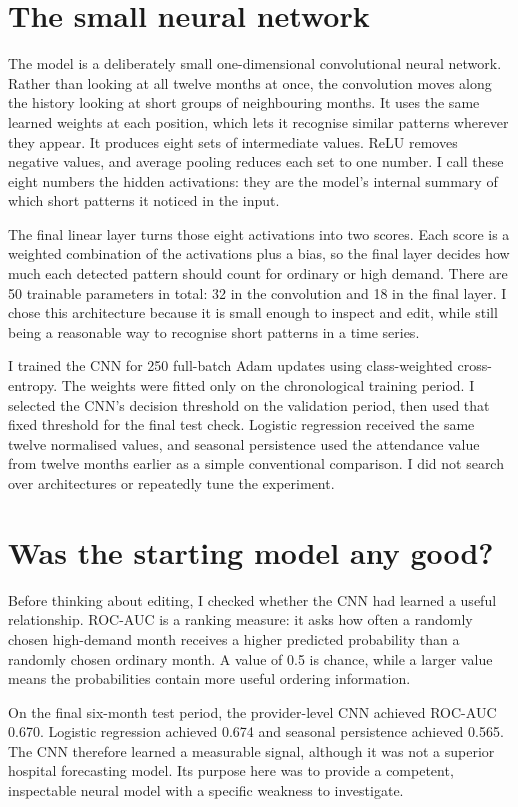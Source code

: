 \documentclass[11pt,a4paper]{article}
\begin{document}
\section*{The small neural network}
The model is a deliberately small one-dimensional convolutional neural network. Rather than looking at all twelve months at once, the convolution moves along the history looking at short groups of neighbouring months. It uses the same learned weights at each position, which lets it recognise similar patterns wherever they appear. It produces eight sets of intermediate values. ReLU removes negative values, and average pooling reduces each set to one number. I call these eight numbers the hidden activations: they are the model's internal summary of which short patterns it noticed in the input.

The final linear layer turns those eight activations into two scores. Each score is a weighted combination of the activations plus a bias, so the final layer decides how much each detected pattern should count for ordinary or high demand. There are 50 trainable parameters in total: 32 in the convolution and 18 in the final layer. I chose this architecture because it is small enough to inspect and edit, while still being a reasonable way to recognise short patterns in a time series.

I trained the CNN for 250 full-batch Adam updates using class-weighted cross-entropy. The weights were fitted only on the chronological training period. I selected the CNN's decision threshold on the validation period, then used that fixed threshold for the final test check. Logistic regression received the same twelve normalised values, and seasonal persistence used the attendance value from twelve months earlier as a simple conventional comparison. I did not search over architectures or repeatedly tune the experiment.

\section*{Was the starting model any good?}
Before thinking about editing, I checked whether the CNN had learned a useful relationship. ROC-AUC is a ranking measure: it asks how often a randomly chosen high-demand month receives a higher predicted probability than a randomly chosen ordinary month. A value of 0.5 is chance, while a larger value means the probabilities contain more useful ordering information.

On the final six-month test period, the provider-level CNN achieved ROC-AUC 0.670. Logistic regression achieved 0.674 and seasonal persistence achieved 0.565. The CNN therefore learned a measurable signal, although it was not a superior hospital forecasting model. Its purpose here was to provide a competent, inspectable neural model with a specific weakness to investigate.
\end{document}
